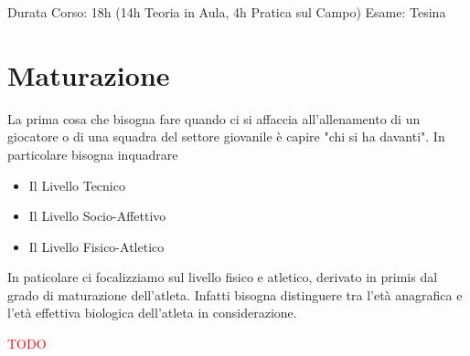 \documentclass[../uefaC.tex]{subfiles}
\begin{document}
\onlyinsubfile{\maketitle}

\onlyinsubfile{}

\onlyinsubfile{\tableofcontents}


Durata Corso: 18h (14h Teoria in Aula, 4h Pratica sul Campo)
Esame: Tesina

\section{Maturazione}

La prima cosa che bisogna fare quando ci si affaccia all'allenamento di un giocatore o di una squadra del settore giovanile è capire "chi si ha davanti". In particolare bisogna inquadrare
\begin{itemize}
    \item{Il Livello Tecnico}
    \item{Il Livello Socio-Affettivo}
    \item{Il Livello Fisico-Atletico}
\end{itemize}

In paticolare ci focalizziamo sul livello fisico e atletico, derivato in primis dal grado di maturazione dell'atleta. Infatti bisogna distinguere tra l'età anagrafica e l'età effettiva biologica dell'atleta in considerazione.

\textcolor{red}{TODO}
\end{document}
